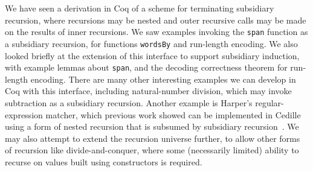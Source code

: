 \documentclass[a4paper,USenglish]{lipics-v2021}
\begin{document}
We have seen a derivation in Coq of a scheme for terminating
subsidiary recursion, where recursions may be nested and outer
recursive calls may be made on the results of inner recursions.  We saw
examples invoking the \verb|span| function as a subsidiary recursion,
for functions \verb|wordsBy| and run-length encoding.  We also looked
briefly at the extension of this interface to support subsidiary
induction, with example lemmas about \verb|span|, and the decoding
correctness theorem for run-length encoding.  There are many other
interesting examples we can develop in Coq with this interface,
including natural-number division, which may invoke subtraction as a
subsidiary recursion.  Another example is Harper's regular-expression
matcher, which previous work showed can be implemented in Cedille
using a form of nested recursion that is subsumed by subsidiary
recursion~\cite{stump20}.  We may also attempt to extend the recursion
universe further, to allow other forms of recursion like
divide-and-conquer, where some (necessarily limited) ability to
recurse on values built using constructors is required.

\pagebreak

\end{document}
